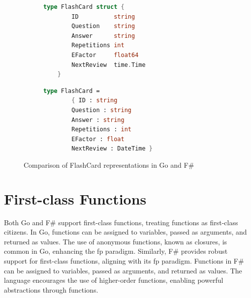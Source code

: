 \begin{figure}[ht]
    \begin{subfigure}{0.48\textwidth}
        \begin{lstlisting}[language=go, firstnumber=1, caption={FlashCard representation in Go}, label=l:flashcardgo]
    type FlashCard struct {
        ID          string
        Question    string
        Answer      string
        Repetitions int
        EFactor     float64
        NextReview  time.Time
    }
        \end{lstlisting}
    \end{subfigure}\hfill
    \begin{subfigure}{0.48\textwidth}
        \begin{lstlisting}[language=FSharp, firstnumber=1, caption={FlashCard representation in F\#}, label=l:flashcardfsharp]
    type FlashCard =
        { ID : string
        Question : string
        Answer : string
        Repetitions : int
        EFactor : float
        NextReview : DateTime }
        \end{lstlisting}
    \end{subfigure}
    \caption{Comparison of FlashCard representations in Go and F\#}
    \label{fig:flashcardcomparison}
    \end{figure}

    \section{First-class Functions}\label{sec:first-class-functions}
    Both Go and F\# support first-class functions, treating functions as first-class citizens. In Go, functions can be assigned to variables, passed as arguments, and returned as values. The use of anonymous functions, known as closures, is common in Go, enhancing the \ac{fp} paradigm. Similarly, F\# provides robust support for first-class functions, aligning with its \ac{fp} paradigm. Functions in F\# can be assigned to variables, passed as arguments, and returned as values. The language encourages the use of higher-order functions, enabling powerful abstractions through functions.

